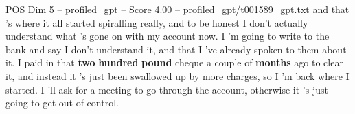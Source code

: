\begin{textsample}{POS Dim 5 – profiled\_gpt – Score 4.00 – profiled\_gpt/t001589\_gpt.txt}  \label{ex:f5_pos_024}
and that ’s where it all started spiralling really, and to be honest I don't actually understand what ’s gone on with my account now.
I ’m going to write to the bank and say I don't understand it, and that I ’ve already spoken to them about it.
I paid in that \textbf{two} \textbf{hundred} \textbf{pound} cheque a couple of \textbf{months} ago to clear it, and instead it ’s just been swallowed up by more charges, so I ’m back where I started.
I ’ll ask for a meeting to go through the account, otherwise it ’s just going to get out of control.

\end{textsample}
